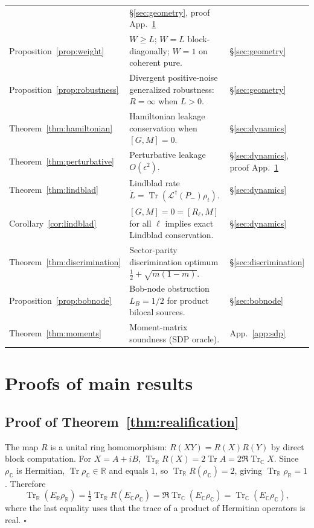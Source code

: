 \documentclass[a4paper,onecolumn,noarxiv]{quantumarticle}
\theoremstyle{plain}
\theoremstyle{definition}
\theoremstyle{remark}
\newcommand{\R}{\mathbb{R}}
\newcommand{\C}{\mathbb{C}}
\newcommand{\Pminus}{P_{-}}
\newcommand{\Mop}{M}
\newcommand{\Tr}{\operatorname{Tr}}
\newcommand{\Ldag}{\mathcal{L}^{\dagger}}
\newcommand{\Lleak}{L}
\begin{document}
\begin{center}
\begin{tabular}{@{}lll@{}}
  & \S\ref{sec:geometry}, proof App.~\ref{app:proofs} \\
Proposition~\ref{prop:weight}
  & $W\ge\Lleak$; $W=\Lleak$ block-diagonally; $W=1$ on coherent pure.
  & \S\ref{sec:geometry} \\
Proposition~\ref{prop:robustness}
  & Divergent positive-noise generalized robustness: $R=\infty$ when $\Lleak>0$.
  & \S\ref{sec:geometry} \\
Theorem~\ref{thm:hamiltonian}
  & Hamiltonian leakage conservation when $[G,\Mop]=0$.
  & \S\ref{sec:dynamics} \\
Theorem~\ref{thm:perturbative}
  & Perturbative leakage $O(\epsilon^2)$.
  & \S\ref{sec:dynamics}, proof App.~\ref{app:proofs} \\
Theorem~\ref{thm:lindblad}
  & Lindblad rate $\dot\Lleak=\Tr(\Ldag(\Pminus)\rho_t)$.
  & \S\ref{sec:dynamics} \\
Corollary~\ref{cor:lindblad}
  & $[G,\Mop]=0=[R_\ell,\Mop]$ for all $\ell$ implies exact Lindblad conservation.
  & \S\ref{sec:dynamics} \\
Theorem~\ref{thm:discrimination}
  & Sector-parity discrimination optimum $\tfrac{1}{2}+\sqrt{m(1-m)}$.
  & \S\ref{sec:discrimination} \\
Proposition~\ref{prop:bobnode}
  & Bob-node obstruction $\Lleak_B=1/2$ for product bilocal sources.
  & \S\ref{sec:bobnode} \\
Theorem~\ref{thm:moments}
  & Moment-matrix soundness (SDP oracle).
  & App.~\ref{app:sdp} \\
\bottomrule
\end{tabular}
\end{center}

\section{Proofs of main results}
\label{app:proofs}

\subsection*{Proof of Theorem~\ref{thm:realification}}

The map $R$ is a unital ring homomorphism: $R(XY)=R(X)R(Y)$ by direct block
computation. For $X=A+iB$, $\Tr_\R R(X)=2\Tr A=2\Re\Tr_\C X$. Since $\rho_\C$ is
Hermitian, $\Tr\rho_\C\in\R$ and equals $1$, so $\Tr_\R R(\rho_\C)=2$, giving
$\Tr_\R\rho_\R=1$. Therefore
\[
  \Tr_\R(E_\R\rho_\R) = \tfrac{1}{2}\Tr_\R R(E_\C\rho_\C)
  = \Re\Tr_\C(E_\C\rho_\C) = \Tr_\C(E_\C\rho_\C),
\]
where the last equality uses that the trace of a product of Hermitian operators is
real. \hfill$\square$
\end{document}
